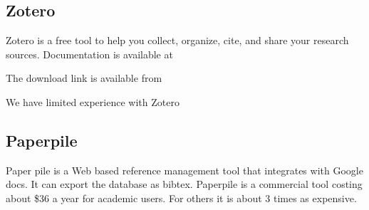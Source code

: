 \subsection{Zotero}

Zotero is a free tool to help you collect, organize, cite, and share
your research sources. Documentation is available at


The download link is available from



We have limited experience with Zotero

\subsection{Paperpile}

Paper pile is a Web based reference management tool that integrates
with Google docs. It can export the database as bibtex. Paperpile is a
commercial tool costing about \$36 a year for academic users. For
others it is about 3 times as expensive.

